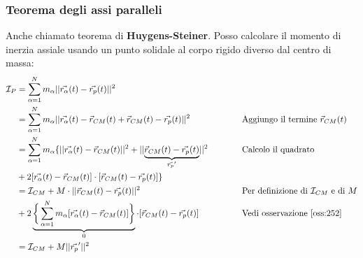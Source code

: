 \subsubsection{Teorema degli assi paralleli}
Anche chiamato teorema di \textbf{Huygens-Steiner}. Posso calcolare il momento di inerzia assiale usando un punto solidale al corpo rigido diverso dal centro di massa:
\begin{equation}
	\label{eq:huygens_steiner}
	\begin{alignedat}{2}
		\mathcal{I}_P & = \sum_{\alpha=1}^N m_\alpha \lvert\lvert \vec{r_\alpha}(t) - \vec{r_p}(t) \rvert\rvert^2 \\
		& = \sum_{\alpha=1}^N m_\alpha \lvert\lvert \vec{r_\alpha}(t) - \vec{r}_{CM}(t) + \vec{r}_{CM}(t) - \vec{r_p}(t) \rvert\rvert^2 \qquad \qquad\qquad && \text{Aggiungo il termine } \vec{r}_{CM}(t)\\
		& = \sum_{\alpha=1}^N m_\alpha \{\lvert\lvert \vec{r_\alpha}(t) - \vec{r}_{CM}(t)\rvert\rvert^2 + \lvert\lvert \underbrace{\vec{r}_{CM}(t) - \vec{r_p}(t)}_{\vec{r_p}'} \rvert\rvert^2 && \text{Calcolo il quadrato}\\
		& + 2 [\vec{r_\alpha}(t) - \vec{r}_{CM}(t)] \cdot [\vec{r}_{CM}(t) - \vec{r_p}(t)]\} \\
		& = \mathcal{I}_{CM} + M \cdot \lvert\lvert \vec{r}_{CM}(t) - \vec{r_p}(t) \rvert\rvert^2 && \text{Per definizione di }\mathcal{I}_{CM} \text{ e di }M\\
		& + 2 \underbrace{\bigg\{\sum_{\alpha=1}^N m_\alpha [\vec{r_\alpha}(t) - \vec{r}_{CM}(t)]\bigg\}}_0 \cdot [\vec{r}_{CM}(t) - \vec{r_p}(t)] && \text{Vedi osservazione \ref{oss:252}}\\
		& = \mathcal{I}_{CM} + M \lvert\lvert \vec{r_p}' \rvert\rvert^2
	\end{alignedat}
\end{equation}

